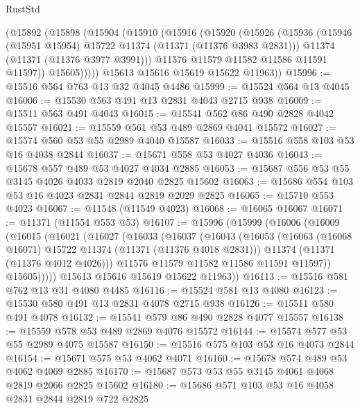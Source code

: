 \begin{lexlean}{RustStd}
\begin{coremodule}
        (@15892
          (@15898
            (@15904
              (@15910
                (@15916
                  (@15920
                    (@15926
                      (@15936
                        (@15946 (@15951 @15954) @15722 @11374 (@11371 (@11376 @3983 @2831)))
                        @11374
                        (@11371 (@11376 @3977 @3991)))
                      @11576
                      @11579
                      @11582
                      @11586
                      @11591
                      @11597))
                  @15605)))))
        @15613
        @15616
        @15619
        @15622
        @11963))
@15996 := @15516 @564 @763 @13 @32 @4045 @4486
@15999 := @15524 @564 @13 @4045
@16006 := @15530 @563 @491 @13 @2831 @4043 @2715 @938
@16009 := @15511 @563 @491 @4043
@16015 := @15541 @562 @86 @490 @2828 @4042 @15557
@16021 := @15559 @561 @53 @489 @2869 @4041 @15572
@16027 := @15574 @560 @53 @55 @2989 @4040 @15587
@16033 := @15516 @558 @103 @53 @16 @4038 @2844
@16037 := @15671 @558 @53 @4027 @4036
@16043 := @15678 @557 @489 @53 @4027 @4034 @2885
@16053 := @15687 @556 @53 @55 @3145 @4026 @4033 @2819 @2040 @2825 @15602
@16063 := @15686 @554 @103 @53 @16 @4023 @2831 @2844 @2819 @2029 @2825
@16065 := @15710 @553 @4023
@16067 := @11548 (@11549 @4023)
@16068 := @16065 @16067
@16071 := @11371 (@11554 @553 @53)
@16107 := @15996
    (@15999
      (@16006
        (@16009
          (@16015
            (@16021
              (@16027
                (@16033
                  (@16037
                    (@16043
                      (@16053
                        (@16063 (@16068 @16071) @15722 @11374 (@11371 (@11376 @4018 @2831)))
                        @11374
                        (@11371 (@11376 @4012 @4026)))
                      @11576
                      @11579
                      @11582
                      @11586
                      @11591
                      @11597))
                  @15605)))))
        @15613
        @15616
        @15619
        @15622
        @11963))
@16113 := @15516 @581 @762 @13 @31 @4080 @4485
@16116 := @15524 @581 @13 @4080
@16123 := @15530 @580 @491 @13 @2831 @4078 @2715 @938
@16126 := @15511 @580 @491 @4078
@16132 := @15541 @579 @86 @490 @2828 @4077 @15557
@16138 := @15559 @578 @53 @489 @2869 @4076 @15572
@16144 := @15574 @577 @53 @55 @2989 @4075 @15587
@16150 := @15516 @575 @103 @53 @16 @4073 @2844
@16154 := @15671 @575 @53 @4062 @4071
@16160 := @15678 @574 @489 @53 @4062 @4069 @2885
@16170 := @15687 @573 @53 @55 @3145 @4061 @4068 @2819 @2066 @2825 @15602
@16180 := @15686 @571 @103 @53 @16 @4058 @2831 @2844 @2819 @722 @2825

\end{coremodule}
\end{lexlean}
